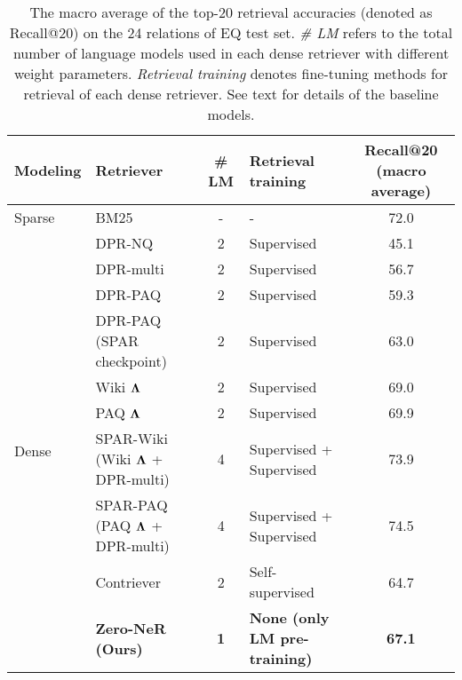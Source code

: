 \documentclass[letterpaper]{article} \usepackage{aaai23}  \usepackage{times}  \usepackage{helvet}  \usepackage{courier}  \usepackage[hyphens]{url}  \usepackage{graphicx} \urlstyle{rm} \def\UrlFont{\rm}  \usepackage{natbib}  \usepackage{caption} \frenchspacing  \setlength{\pdfpagewidth}{8.5in}  \setlength{\pdfpageheight}{11in}  \usepackage{algorithm}
\begin{document}
\begin{table*}[t]
	\centering
	\renewcommand{\arraystretch}{1.15}
	\begin{tabular}{llclc}
		\toprule
		\textbf{Modeling}       & \textbf{Retriever}                          & \textbf{\# LM} & \textbf{Retrieval training}          & \textbf{Recall@20 (macro average)} \\
		\midrule
		Sparse                  & BM25                                        & -              & -                                    & 72.0                               \\
		\hline
		\multirow{10}{*}{Dense} & DPR-NQ                                      & 2              & Supervised                           & 45.1                               \\
		                        & DPR-multi                                   & 2              & Supervised                           & 56.7                               \\
		                        & DPR-PAQ \citep{sciavolino-etal-2021-simple} & 2              & Supervised                           & 59.3                               \\
		                        & DPR-PAQ (SPAR checkpoint)                   & 2              & Supervised                           & 63.0                               \\
		                        & Wiki $\bf{\Lambda}$                         & 2              & Supervised                           & 69.0                               \\
		                        & PAQ $\bf{\Lambda}$                          & 2              & Supervised                           & 69.9                               \\
		                        & SPAR-Wiki (Wiki $\bf{\Lambda}$ + DPR-multi) & 4              & Supervised + Supervised              & 73.9                               \\
		                        & SPAR-PAQ (PAQ $\bf{\Lambda}$ + DPR-multi)   & 4              & Supervised + Supervised              & 74.5                               \\
		\cline{2-5}
		                        & Contriever                                  & 2              & Self-supervised                      & 64.7                               \\
		\cline{2-5}
		                        & \textbf{Zero-NeR (Ours)}                    & \textbf{1}     & \textbf{None (only LM pre-training)} & \textbf{67.1}                      \\
		\bottomrule
	\end{tabular}
	\caption{
		The macro average of the top-20 retrieval accuracies (denoted as Recall@20) on the 24 relations of EQ test set.
		\textit{\# LM} refers to the total number of language models used in each dense retriever with different weight parameters.
		\textit{Retrieval training} denotes fine-tuning methods for retrieval of each dense retriever.
		See text for details of the baseline models.
	}
	\label{tab:acc}
\end{table*}
\end{document}
